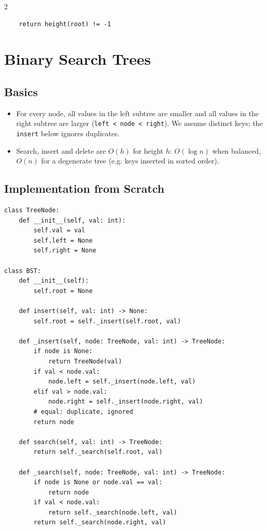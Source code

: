 \documentclass[9pt,a4paper]{extarticle}
\begin{document}
\begin{multicols}{2}
\begin{lstlisting}
    return height(root) != -1
\end{lstlisting}

\section{Binary Search Trees}

\subsection{Basics}

\begin{itemize}
\item For every node, all values in the left subtree are smaller and all values in the right subtree are larger (\texttt{left < node < right}). We assume distinct keys; the \texttt{insert} below ignores duplicates.
\item Search, insert and delete are $O(h)$ for height $h$: $O(\log n)$ when balanced, $O(n)$ for a degenerate tree (e.g. keys inserted in sorted order).
\end{itemize}

\subsection{Implementation from Scratch}

\begin{lstlisting}
class TreeNode:
    def __init__(self, val: int):
        self.val = val
        self.left = None
        self.right = None

class BST:
    def __init__(self):
        self.root = None

    def insert(self, val: int) -> None:
        self.root = self._insert(self.root, val)

    def _insert(self, node: TreeNode, val: int) -> TreeNode:
        if node is None:
            return TreeNode(val)
        if val < node.val:
            node.left = self._insert(node.left, val)
        elif val > node.val:
            node.right = self._insert(node.right, val)
        # equal: duplicate, ignored
        return node

    def search(self, val: int) -> TreeNode:
        return self._search(self.root, val)

    def _search(self, node: TreeNode, val: int) -> TreeNode:
        if node is None or node.val == val:
            return node
        if val < node.val:
            return self._search(node.left, val)
        return self._search(node.right, val)


\end{lstlisting}
\end{multicols}
\end{document}
